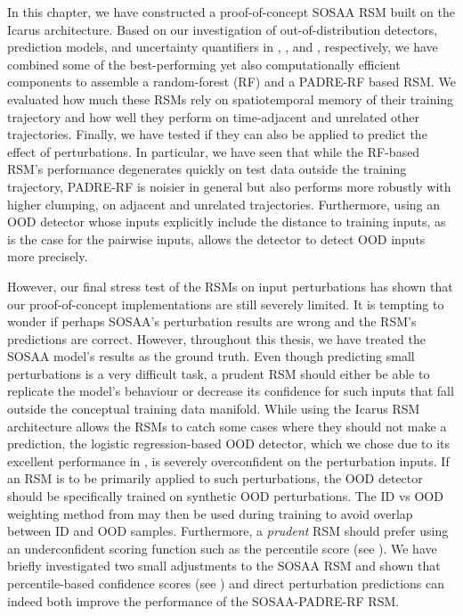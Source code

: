 In this chapter, we have constructed a proof-of-concept SOSAA RSM built on the Icarus architecture. Based on our investigation of out-of-distribution detectors, prediction models, and uncertainty quantifiers in , , and , respectively, we have combined some of the best-performing yet also computationally efficient components to assemble a random-forest (RF) and a PADRE-RF based RSM. We evaluated how much these RSMs rely on spatiotemporal memory of their training trajectory and how well they perform on time-adjacent and unrelated other trajectories. Finally, we have tested if they can also be applied to predict the effect of perturbations. In particular, we have seen that while the RF-based RSM's performance degenerates quickly on test data outside the training trajectory, PADRE-RF is noisier in general but also performs more robustly with higher clumping, on adjacent and unrelated trajectories. Furthermore, using an OOD detector whose inputs explicitly include the distance to training inputs, as is the case for the pairwise inputs, allows the detector to detect OOD inputs more precisely.

\newpar However, our final stress test of the RSMs on input perturbations has shown that our proof-of-concept implementations are still severely limited. It is tempting to wonder if perhaps SOSAA's perturbation results are wrong and the RSM's predictions are correct. However, throughout this thesis, we have treated the SOSAA model's results as the ground truth. Even though predicting small perturbations is a very difficult task, a prudent RSM should either be able to replicate the model's behaviour or decrease its confidence for such inputs that fall outside the conceptual training data manifold. While using the Icarus RSM architecture allows the RSMs to catch some cases where they should not make a prediction, the logistic regression-based OOD detector, which we chose due to its excellent performance in , is severely overconfident on the perturbation inputs. If an RSM is to be primarily applied to such perturbations, the OOD detector should be specifically trained on synthetic OOD perturbations. The ID vs OOD weighting method from  may then be used during training to avoid overlap between ID and OOD samples. Furthermore, a \textit{prudent} RSM should prefer using an underconfident scoring function such as the percentile score (see ). We have briefly investigated two small adjustments to the SOSAA RSM and shown that percentile-based confidence scores (see ) and direct perturbation predictions can indeed both improve the performance of the SOSAA-PADRE-RF RSM.

